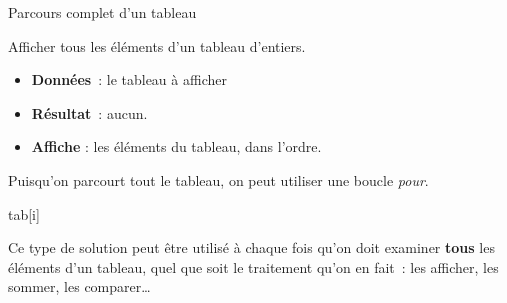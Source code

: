 \begin{Fiche}{Parcours complet d’un tableau}
\label{fiche:tab-parcours-complet}

	Afficher tous les éléments d’un tableau d’entiers.

	
	\begin{itemize}
	\item \textbf{Données}~: le tableau à afficher
	\item \textbf{Résultat}~: aucun.
	\item \textbf{Affiche} : les éléments du tableau, dans l'ordre.
	\end{itemize}


	Puisqu’on parcourt tout le tableau,
	on peut utiliser une boucle \emph{pour}.
	
	\begin{LDA}
				\Write tab[i]
			\EndFor
		\EndAlgo
	\end{LDA}


	Ce type de solution peut être utilisé à chaque fois
	qu’on doit examiner \textbf{tous} les éléments d’un tableau,
	quel que soit le traitement qu’on en fait~:
	les afficher, les sommer, les comparer\dots
	
	
\end{Fiche}

